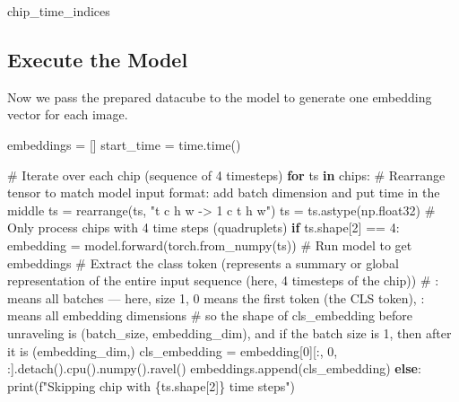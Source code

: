 \documentclass[
  letterpaper,
  DIV=11,
  numbers=noendperiod]{scrreprt}
\newenvironment{Shaded}{\begin{snugshade}}{\end{snugshade}}
\newcommand{\BuiltInTok}[1]{\textcolor[rgb]{0.00,0.23,0.31}{#1}}
\newcommand{\CommentTok}[1]{\textcolor[rgb]{0.37,0.37,0.37}{#1}}
\newcommand{\ControlFlowTok}[1]{\textcolor[rgb]{0.00,0.23,0.31}{\textbf{#1}}}
\newcommand{\DecValTok}[1]{\textcolor[rgb]{0.68,0.00,0.00}{#1}}
\newcommand{\KeywordTok}[1]{\textcolor[rgb]{0.00,0.23,0.31}{\textbf{#1}}}
\newcommand{\NormalTok}[1]{\textcolor[rgb]{0.00,0.23,0.31}{#1}}
\newcommand{\OperatorTok}[1]{\textcolor[rgb]{0.37,0.37,0.37}{#1}}
\newcommand{\SpecialCharTok}[1]{\textcolor[rgb]{0.37,0.37,0.37}{#1}}
\newcommand{\SpecialStringTok}[1]{\textcolor[rgb]{0.13,0.47,0.30}{#1}}
\newcommand{\StringTok}[1]{\textcolor[rgb]{0.13,0.47,0.30}{#1}}
\begin{document}
\begin{Shaded}
\begin{Highlighting}[]
\NormalTok{chip\_time\_indices}
\end{Highlighting}
\end{Shaded}

\subsection{Execute the Model}\label{execute-the-model}

Now we pass the prepared datacube to the model to generate one embedding
vector for each image.

\begin{Shaded}
\begin{Highlighting}[]
\NormalTok{embeddings }\OperatorTok{=}\NormalTok{ []}
\NormalTok{start\_time }\OperatorTok{=}\NormalTok{ time.time()}

\CommentTok{\# Iterate over each chip (sequence of 4 timesteps)}
\ControlFlowTok{for}\NormalTok{ ts }\KeywordTok{in}\NormalTok{ chips:}
    \CommentTok{\# Rearrange tensor to match model input format: add batch dimension and put time in the middle}
\NormalTok{    ts }\OperatorTok{=}\NormalTok{ rearrange(ts, }\StringTok{"t c h w {-}\textgreater{} 1 c t h w"}\NormalTok{)}
\NormalTok{    ts }\OperatorTok{=}\NormalTok{ ts.astype(np.float32)}
    \CommentTok{\# Only process chips with 4 time steps (quadruplets)}
    \ControlFlowTok{if}\NormalTok{ ts.shape[}\DecValTok{2}\NormalTok{] }\OperatorTok{==} \DecValTok{4}\NormalTok{:}
\NormalTok{        embedding }\OperatorTok{=}\NormalTok{ model.forward(torch.from\_numpy(ts)) }\CommentTok{\# Run model to get embeddings}
        \CommentTok{\# Extract the class token (represents a summary or global representation of the entire input sequence (here, 4 timesteps of the chip))}
        \CommentTok{\# \textasciigrave{}:\textasciigrave{} means all batches — here, size 1, \textasciigrave{}0\textasciigrave{} means the first token (the CLS token), \textasciigrave{}:\textasciigrave{} means all embedding dimensions}
        \CommentTok{\# so the shape of cls\_embedding before unraveling is (batch\_size, embedding\_dim), and if the batch size is 1, then after it is (embedding\_dim,)}
\NormalTok{        cls\_embedding }\OperatorTok{=}\NormalTok{ embedding[}\DecValTok{0}\NormalTok{][:, }\DecValTok{0}\NormalTok{, :].detach().cpu().numpy().ravel()}
\NormalTok{        embeddings.append(cls\_embedding)}
    \ControlFlowTok{else}\NormalTok{:}
        \BuiltInTok{print}\NormalTok{(}\SpecialStringTok{f"Skipping chip with }\SpecialCharTok{\{}\NormalTok{ts}\SpecialCharTok{.}\NormalTok{shape[}\DecValTok{2}\NormalTok{]}\SpecialCharTok{\}}\SpecialStringTok{ time steps"}\NormalTok{)}


\end{Highlighting}
\end{Shaded}
\end{document}
